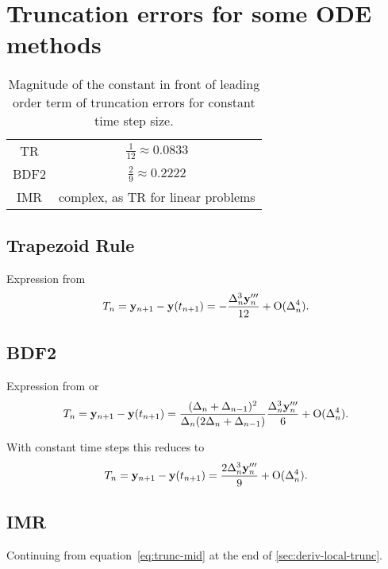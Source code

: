\chapter{Truncation errors for some ODE methods}

\begin{table}[h]
  \centering
  \begin{tabular}{c|c}
    TR & $\frac{1}{12} \approx 0.0833$ \\
    BDF2 & $\frac{2}{9} \approx 0.2222$ \\
    IMR & complex, as TR for linear problems
  \end{tabular}
  \caption{Magnitude of the constant in front of leading order term of truncation errors for constant time step size.}
  \label{tab:truncation-errors}
\end{table}

\section{Trapezoid Rule}

Expression from \cite[261]{GreshoSani}
\begin{equation}
  \label{eq:tr-lte-conststep}
  T_n = \mathbf{y}_{n+1} - \mathbf{y}(t_{n+1}) = -\frac{\Delta_{n}^3 \mathbf{y}_n'''}{12}
  + \text{O}(\Delta_{n}^4).
\end{equation}

\section{BDF2}

Expression from \cite[715]{GreshoSani} or \cite[eq. (2.43)]{Prinja2010}
\begin{equation}
  \label{eq:bdf2-lte}
  T_n = \mathbf{y}_{n+1} - \mathbf{y}(t_{n+1}) = \frac{(\Delta_{n} + \Delta_{n-1})^2}{\Delta_{n}(2\Delta_{n} + \Delta_{n-1})}
  \frac{\Delta_{n}^3 \mathbf{y}_n'''}{6}
  + \text{O}(\Delta_{n}^4).
\end{equation}

With constant time steps this reduces to
\begin{equation}
  \label{eq:bdf2-lte}
  T_n = \mathbf{y}_{n+1} - \mathbf{y}(t_{n+1}) =  \frac{2\Delta_{n}^3 \mathbf{y}_n'''}{9}
  + \text{O}(\Delta_{n}^4).
\end{equation}

\section{IMR}
\label{sec:full-imr-lte-calculation}

Continuing from equation~\eqref{eq:trunc-mid} at the end of \autoref{sec:deriv-local-trunc}.

